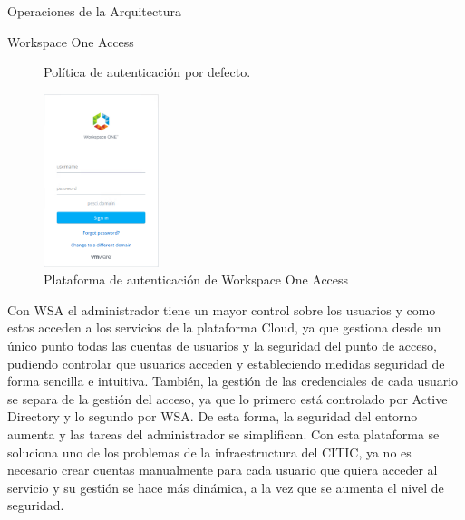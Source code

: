\begin{subsection}{Operaciones de la Arquitectura}
\begin{subsubsection}{Workspace One Access}
\begin{figure}[h]
            \caption{Política de autenticación por defecto.}
            \label{fig:default-policy}
        \end{figure}
        \FloatBarrier
        
        \begin{figure}[h]
            \centering
            \includegraphics[width=0.3\textwidth]{imaxes/pruebaconcepto/vrealize/wsa-login.png}
            \caption{Plataforma de autenticación de Workspace One Access}
            \label{fig:wsa-platform}
        \end{figure}
        \FloatBarrier        
        Con WSA el administrador tiene un mayor control sobre los usuarios y como estos acceden a los servicios de la plataforma Cloud, ya que gestiona desde un único punto todas las cuentas de usuarios y la seguridad del punto de acceso, pudiendo controlar que usuarios acceden y estableciendo medidas seguridad de forma sencilla e intuitiva. También, la gestión de las credenciales de cada usuario se separa de la gestión del acceso, ya que lo primero está controlado por Active Directory y lo segundo por WSA. De esta forma, la seguridad del entorno aumenta y las tareas del administrador se simplifican. Con esta plataforma se soluciona uno de los problemas de la infraestructura del CITIC, ya no es necesario crear cuentas manualmente para cada usuario que quiera acceder al servicio y su gestión se hace más dinámica, a la vez que se aumenta el nivel de seguridad.


\end{subsubsection}
\end{subsection}
